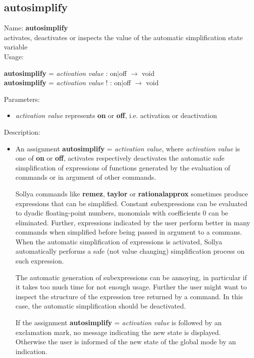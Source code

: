 \subsection{autosimplify}
\label{labautosimplify}
\noindent Name: \textbf{autosimplify}\\
activates, deactivates or inspects the value of the automatic simplification state variable\\

\noindent Usage: 
\begin{center}
\textbf{autosimplify} = \emph{activation value} : \textsf{on$|$off} $\rightarrow$ \textsf{void}\\
\textbf{autosimplify} = \emph{activation value} ! : \textsf{on$|$off} $\rightarrow$ \textsf{void}\\
\end{center}
Parameters: 
\begin{itemize}
\item \emph{activation value} represents \textbf{on} or \textbf{off}, i.e. activation or deactivation
\end{itemize}
\noindent Description: \begin{itemize}

\item An assignment \textbf{autosimplify} = \emph{activation value}, where \emph{activation value}
   is one of \textbf{on} or \textbf{off}, activates respectively deactivates the
   automatic safe simplification of expressions of functions generated by
   the evaluation of commands or in argument of other commands.
    
   Sollya commands like \textbf{remez}, \textbf{taylor} or \textbf{rationalapprox} sometimes
   produce expressions that can be simplified. Constant subexpressions
   can be evaluated to dyadic floating-point numbers, monomials with
   coefficients $0$ can be eliminated. Further, expressions
   indicated by the user perform better in many commands when simplified
   before being passed in argument to a commans. When the automatic
   simplification of expressions is activated, Sollya automatically
   performs a safe (not value changing) simplification process on such
   expression.
    
   The automatic generation of subexpressions can be annoying, in
   particular if it takes too much time for not enough usage. Further the
   user might want to inspect the structure of the expression tree
   returned by a command. In this case, the automatic simplification
   should be deactivated.
    
   If the assignment \textbf{autosimplify} = \emph{activation value} is followed by an
   exclamation mark, no message indicating the new state is
   displayed. Otherwise the user is informed of the new state of the
   global mode by an indication.
\end{itemize}
